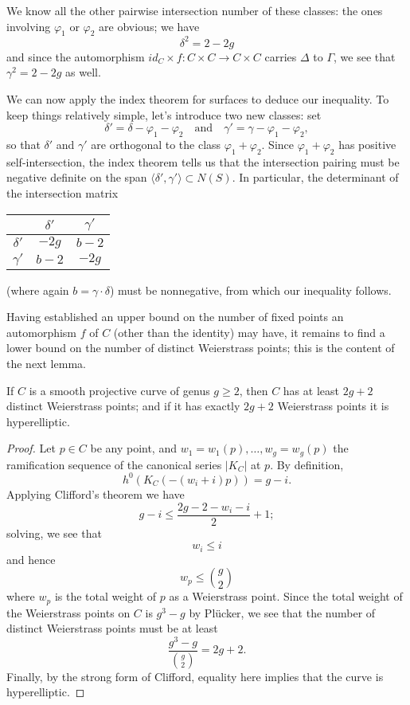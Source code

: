We know all the other pairwise intersection number of these classes: the ones involving $\varphi_1$ or $\varphi_2$ are obvious; we have
$$
\delta^2 = 2 - 2g
$$
and since the automorphism $id_C \times f : C\times C \to C \times C$ carries $\Delta$ to $\Gamma$, we see that $\gamma^2 = 2-2g$ as well.

We can now apply the index theorem for surfaces to deduce our inequality. To keep things relatively simple, let's introduce two new classes: set
$$
\delta' = \delta - \varphi_1 - \varphi_2 \quad \text{and} \quad \gamma' = \gamma - \varphi_1 - \varphi_2,
$$
so that $\delta'$ and $\gamma'$ are orthogonal to the class $\varphi_1 + \varphi_2$. Since $\varphi_1 + \varphi_2$ has positive self-intersection, the index theorem tells us that the intersection pairing must be negative definite on the span $\langle \delta',\gamma' \rangle \subset N(S)$. In particular, the determinant of the intersection matrix


\begin{center}
\begin{tabular}{c|c|c}
& $\delta'$ &  $\gamma'$  \\
\hline
$\delta'$ & $-2g$ & $b-2$ \\
\hline
$\gamma'$ & $b-2$ & $-2g$ 
\end{tabular}
\end{center}
(where again $b = \gamma \cdot \delta$) must be nonnegative, from which our inequality follows.

Having established an upper bound on the number of fixed points an automorphism $f$ of $C$ (other than the identity) may have, it remains to find a lower bound on the number of distinct Weierstrass points; this is the content of the next lemma.


\begin{lemma}
If $C$ is a smooth projective curve of genus $g \geq 2$, then $C$ has at least $2g+2$ distinct Weierstrass points; and if it has exactly $2g+2$ Weierstrass points it is hyperelliptic.
\end{lemma}

\begin{proof}
Let $p \in C$ be any point, and $w_1=w_1(p),\dots,w_g = w_g(p)$ the ramification sequence of the canonical series $|K_C|$ at $p$. By definition, 
$$
h^0(K_C(-(w_i+i)p)) = g - i.
$$
Applying Clifford's theorem we have
$$
g-i \leq \frac{2g - 2 - w_i - i}{2} + 1;
$$
solving, we see that
$$
w_i \leq i
$$
and hence
$$
w_p \leq \binom{g}{2}
$$
where $w_p$ is the total weight of $p$ as a Weierstrass point. Since the total weight of the Weierstrass points on $C$ is $g^3-g$ by Pl\"ucker, we see that the number of distinct Weierstrass points must be at least
$$
\frac{g^3-g}{\binom{g}{2}} = 2g+2.
$$
Finally, by the strong form of Clifford, equality here implies that the curve is hyperelliptic.
\end{proof}




